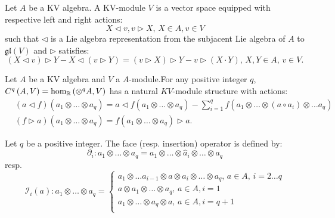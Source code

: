 \begin{defn}
Let $A$ be a KV algebra. A KV-module $V$ is a vector space equipped with respective left and right actions:
\[
X \triangleleft v, v \triangleright X, \, X \in A, v \in V
\]
such that $\triangleleft$ is a Lie algebra representation from the subjacent Lie algebra of $A$ to  $\mathfrak{gl}(V)$ and $\triangleright$  satisfies:
\[
\left( X \triangleleft v \right) \triangleright Y - X \triangleleft \left( 
v \triangleright Y \right) = \left( v \triangleright X \right) \triangleright Y - v \triangleright \left( X \cdot Y \right), \, X,Y \in A, \, v \in V.
\]
\end{defn}
\begin{defn}
    \label{def:kv_complex}
    Let $A$ be a KV algebra and $V$ a $A$-module.For any positive integer $q$, $C^q\left( A, V \right) = \hom_{\mathbb{R}} \left( \otimes^q A, V \right)$ has a natural $KV$-module structure with actions:
    \begin{equation}
        \label{eq:kv_cq}
        \begin{split}
            & \left( a \triangleleft f \right)\left( a_1 \otimes \dots \otimes a_q \right) = a \triangleleft f\left( a_1 \otimes \dots \otimes a_q \right) - \sum_{i=1}^q f\left( 
                a_1 \otimes \dots \otimes \left(a \circ a_i\right) \otimes \dots a_q
             \right) \\
             & \left( f \triangleright a \right)\left( a_1 \otimes \dots \otimes a_q \right) = f\left( a_1 \otimes \dots \otimes a_q \right) \triangleright a.
        \end{split}
    \end{equation}
\end{defn}
\begin{defn}
\label{def:kv_face_insert}
Let $q$ be a positive integer. The face (resp. insertion) operator is defined by:
\begin{equation}
    \label{eq:kv_face}
    \partial_i \colon a_1 \otimes \dots \otimes a_q = a_1 \otimes \dots \otimes \hat{a}_i \otimes \dots \otimes a_q
\end{equation}
resp.
\begin{equation}
    \label{eq:kv_insert}
    \mathcal{I}_i(a) \colon a_1 \otimes \dots \otimes a_q = 
    \begin{cases}
        a_1 \otimes \dots  a_{i-1} \otimes a \otimes a_i \otimes \dots \otimes a_q, \, a \in A, \, i=2 \dots q\\
        a \otimes a_1 \otimes \dots \otimes a_q, \, a \in A, i=1 \\
        a_1 \otimes \dots \otimes a_q \otimes a, \, a \in A, i=q+1 \\
    \end{cases}
\end{equation}
\end{defn}
